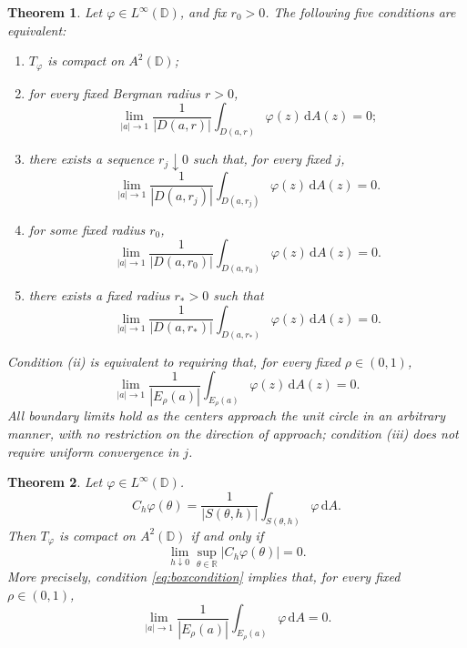 \documentclass[12pt,a4paper]{article}
\newtheorem{theorem}{Theorem}[section]
\theoremstyle{remark}
\newcommand{\D}{\mathbb D}
\newcommand{\dA}{\,\mathrm dA}
\newcommand{\A}{A^2(\D)}
\begin{document}
\begin{theorem}\label{thm:main}
Let \(\varphi\in L^\infty(\mathbb D)\), and fix \(r_0>0\). The following five conditions are equivalent:
\begin{enumerate}[label=\textnormal{(\roman*)}]
\item $T_\varphi$ is compact on $\A$;
\item for every fixed Bergman radius $r>0$,
\begin{equation}\label{eq:bergman}
\lim_{|a|\to1}\frac1{|D(a,r)|}\int_{D(a,r)}\varphi(z)\dA(z)=0;
\end{equation}
\item there exists a sequence $r_j\downarrow0$ such that, for every fixed $j$,
\[
\lim_{|a|\to1}\frac1{|D(a,r_j)|}\int_{D(a,r_j)}\varphi(z)\dA(z)=0.
\]
\item for  some fixed radius $r_0$,
\[
\lim_{|a|\to1}\frac1{|D(a,r_0)|}\int_{D(a,r_0)}\varphi(z)\dA(z)=0.
\]
\item there exists a fixed radius $r_*>0$ such that
\[
\lim_{|a|\to1}\frac1{|D(a,r_*)|}\int_{D(a,r_*)}\varphi(z)\dA(z)=0.
\]
\end{enumerate}
Condition \textnormal{(ii)} is equivalent to requiring that, for every fixed $\rho\in(0,1)$,
\begin{equation}\label{eq:main}
\lim_{|a|\to1}\frac1{|E_\rho(a)|}\int_{E_\rho(a)}\varphi(z)\dA(z)=0.
\end{equation}
All boundary limits hold as the centers approach the unit circle in an arbitrary manner, with no restriction on the direction of approach;
condition \textnormal{(iii)} does not require uniform convergence in  $j$.
\end{theorem}
\begin{theorem}\label{thm:carleson}
Let $\varphi\in L^\infty(\D)$. 
\[
C_h\varphi(\theta)=\frac1{|S(\theta,h)|}\int_{S(\theta,h)}\varphi\dA.
\]Then $T_\varphi$ is compact on $\A$ if and only if
\begin{equation}\label{eq:boxcondition}
\lim_{h\downarrow0}\sup_{\theta\in\mathbb R}|C_h\varphi(\theta)|=0.
\end{equation}
More precisely, condition \eqref{eq:boxcondition} implies that, for every fixed $\rho\in(0,1)$,
\begin{equation}\label{eq:boximpliesdisk}
\lim_{|a|\to1}\frac1{|E_\rho(a)|}\int_{E_\rho(a)}\varphi\dA=0.
\end{equation}

\end{theorem}
\end{document}
